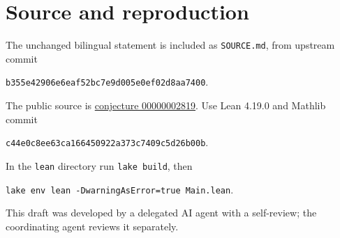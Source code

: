 \documentclass[11pt]{article}
\begin{document}
\section*{Source and reproduction}
The unchanged bilingual statement is included as \texttt{SOURCE.md},
from upstream commit
\begin{center}\small
\texttt{b355e42906e6eaf52bc7e9d005e0ef02d8aa7400}.
\end{center}
The public source is
\href{https://github.com/The-Last-Math-Competition/The-Last-Math-Competition/blob/b355e42906e6eaf52bc7e9d005e0ef02d8aa7400/conjectures/00000002819.md}{conjecture 00000002819}.
Use Lean 4.19.0 and Mathlib commit
\begin{center}\small
\texttt{c44e0c8ee63ca166450922a373c7409c5d26b00b}.
\end{center}
In the \texttt{lean} directory run \texttt{lake build}, then
\begin{center}
\texttt{lake env lean -DwarningAsError=true Main.lean}.
\end{center}
This draft was developed by a delegated AI agent with a self-review;
the coordinating agent reviews it separately.
\end{document}
